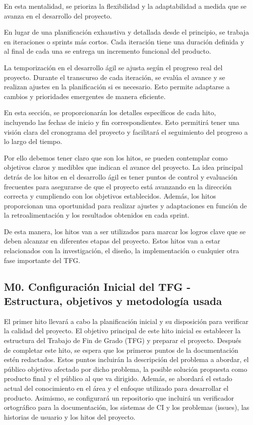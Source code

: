 En esta mentalidad, se prioriza la flexibilidad y la adaptabilidad a medida que se avanza en el desarrollo del proyecto.

En lugar de una planificación exhaustiva y detallada desde el principio, se trabaja en iteraciones o sprints más cortos. Cada iteración tiene una duración definida y al final de cada una se entrega un incremento funcional del producto.

La temporización en el desarrollo ágil se ajusta según el progreso real del proyecto. Durante el transcurso de cada iteración, se evalúa el avance y se realizan ajustes en la planificación si es necesario. Esto permite adaptarse a cambios y prioridades emergentes de manera eficiente.

En esta sección, se proporcionarán los detalles específicos de cada hito, incluyendo las fechas de inicio y fin correspondientes. Esto permitirá tener una visión clara del cronograma del proyecto y facilitará el seguimiento del progreso a lo largo del tiempo.

Por ello debemos tener claro que son los hitos, se pueden contemplar como objetivos claros y medibles que indican el avance del proyecto. La idea principal detrás de los hitos en el desarrollo ágil es tener puntos de control y evaluación frecuentes para asegurarse de que el proyecto está avanzando en la dirección correcta y cumpliendo con los objetivos establecidos. Además, los hitos proporcionan una oportunidad para realizar ajustes y adaptaciones en función de la retroalimentación y los resultados obtenidos en cada sprint. 

De esta manera, los hitos van a ser utilizados para marcar los logros clave que se deben alcanzar en diferentes etapas del proyecto. Estos hitos van a estar relacionados con la investigación, el diseño, la implementación o cualquier otra fase importante del TFG.

\subsection{M0. Configuración Inicial del TFG - Estructura, objetivos y metodología usada}
El primer hito llevará a cabo la planificación inicial y su disposición para verificar la calidad del
proyecto.
El objetivo principal de este hito inicial es establecer la estructura del Trabajo de Fin de Grado (TFG) y preparar el proyecto. Después de completar este hito, se espera que los primeros puntos de la documentación estén redactados. Estos puntos incluirán la descripción del problema a abordar, el público objetivo afectado por dicho problema, la posible solución propuesta como producto final y el público al que va dirigido. Además, se abordará el estado actual del conocimiento en el área y el enfoque utilizado para desarrollar el producto. Asimismo, se configurará un repositorio que incluirá un verificador ortográfico para la documentación, los sistemas de CI y los problemas (issues), las historias de usuario y los hitos del proyecto.

